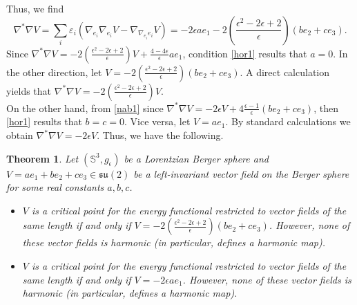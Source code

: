 \documentclass[11pt,oneside,leqno]{amsart}
\theoremstyle{plain}
\newtheorem{theorem}{Theorem}[section]
\begin{document}
Thus, we find
\begin{equation}\label{nab1}
 \nabla^*\nabla V=\sum_i \varepsilon_i( \nabla_{e_i}\nabla_{e_i} V-\nabla_{\nabla_{e_i}e_i}V)
=-2\epsilon ae_1-2(\frac{\epsilon^2-2\epsilon+2}{\epsilon})(be_2+ce_3).   
\end{equation}
Since $\nabla^*\nabla V=-2(\frac{\epsilon^2-2\epsilon+2}{\epsilon})V+\frac{4-4\epsilon}{\epsilon}ae_1$, condition \eqref{hor1} results that $a=0$.
In the other direction, let $V=-2(\frac{\epsilon^2-2\epsilon+2}{\epsilon})(be_2+ce_3)$.  A direct calculation
yields that $\nabla^*\nabla V=-2(\frac{\epsilon^2-2\epsilon+2}{\epsilon})V$.\\
On the other hand, from \eqref{nab1} since $\nabla^*\nabla V=-2\epsilon V+4\frac{\epsilon-1}{\epsilon}(be_2+ce_3)$, then \eqref{hor1} results that $b=c=0$. 
Vice versa, let $V=ae_1$. By standard calculations we obtain $\nabla^*\nabla V=-2\epsilon V$. Thus, we have the following.
\begin{theorem}\label{hor4}
Let $({{\mathbb S}}^3, g_{\epsilon})$ be a Lorentzian Berger sphere and  $V=ae_1+be_2+ce_3\in {{\mathfrak{su}}}(2)$ be a left-invariant vector field on the Berger sphere for some real constants $a,b,c$.
\begin{itemize}
\item[$(a)$] 
$V$ is a critical point for the energy functional restricted to vector fields of the same length if and only if $V=-2(\frac{\epsilon^2-2\epsilon+2}{\epsilon})(be_2+ce_3)$. However, none of these vector fields is harmonic (in particular, defines a harmonic map).
\item[$(b)$] $V$ is a critical point for the energy functional restricted to vector fields of the same length if and only if $V=-2\epsilon ae_1$. However, none of these vector fields is harmonic (in particular, defines a harmonic map).
\end{itemize}
\end{theorem}
\end{document}
